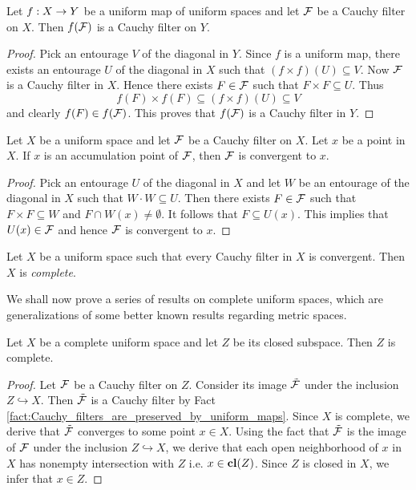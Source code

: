 \begin{fact}\label{fact:Cauchy_filters_are_preserved_by_uniform_maps}
	Let $f:X\rightarrow Y$ be a uniform map of uniform spaces and let ${\mathcal F}$ be a Cauchy filter on $X$. Then $f({\mathcal F})$ is a Cauchy filter on $Y$.
\end{fact}
\begin{proof}
	Pick an entourage $V$ of the diagonal in $Y$. Since $f$ is a uniform map, there exists an entourage $U$ of the diagonal in $X$ such that $\left(f\times f\right)(U) \subseteq V$. Now ${\mathcal F}$ is a Cauchy filter in $X$. Hence there exists $F \in {\mathcal F}$ such that $F\times F \subseteq U$. Thus
	$$f(F)\times f(F) \subseteq \left(f\times f\right)(U) \subseteq V$$
	and clearly $f(F) \in f({\mathcal F})$. This proves that $f({\mathcal F})$ is a Cauchy filter in $Y$.
\end{proof}

\begin{fact}\label{fact:Cauchy_filter_with_accumultation_point_is_convergent}
	Let $X$ be a uniform space and let ${\mathcal F}$ be a Cauchy filter on $X$. Let $x$ be a point in $X$. If $x$ is an accumulation point of ${\mathcal F}$, then ${\mathcal F}$ is convergent to $x$.
\end{fact}
\begin{proof}
	Pick an entourage $U$ of the diagonal in $X$ and let $W$ be an entourage of the diagonal in $X$ such that $W\cdot W \subseteq U$. Then there exists $F \in {\mathcal F}$ such that $F\times F \subseteq W$ and $F\cap W(x)\neq \emptyset$. It follows that $F\subseteq U(x)$. This implies that $U(x) \in {\mathcal F}$ and hence ${\mathcal F}$ is convergent to $x$.
\end{proof}

\begin{definition}
	Let $X$ be a uniform space such that every Cauchy filter in $X$ is convergent. Then $X$ is \textit{complete}.
\end{definition}
\noindent
We shall now prove a series of results on complete uniform spaces, which are generalizations of some better known results regarding metric spaces.

\begin{theorem}\label{theorem:completeness_is_inheritied_by_closed_subspaces}
	Let $X$ be a complete uniform space and let $Z$ be its closed subspace. Then $Z$ is complete.
\end{theorem}
\begin{proof}
	Let ${\mathcal F}$ be a Cauchy filter on $Z$. Consider its image $\tilde{{\mathcal F}}$ under the inclusion $Z\hookrightarrow X$. Then $\tilde{{\mathcal F}}$ is a Cauchy filter by Fact \ref{fact:Cauchy_filters_are_preserved_by_uniform_maps}. Since $X$ is complete, we derive that $\tilde{{\mathcal F}}$ converges to some point $x \in X$. Using the fact that $\tilde{{\mathcal F}}$ is the image of ${\mathcal F}$ under the inclusion $Z\hookrightarrow X$, we derive that each open neighborhood of $x$ in $X$ has nonempty intersection with $Z$ i.e. $x\in \mathbf{cl}(Z)$. Since $Z$ is closed in $X$, we infer that $x \in Z$.
\end{proof}

